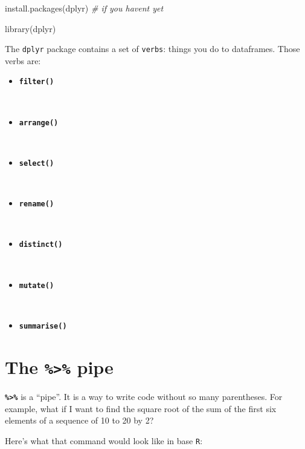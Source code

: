 \documentclass[
]{book}
\newenvironment{Shaded}{\begin{snugshade}}{\end{snugshade}}
\newcommand{\CommentTok}[1]{\textcolor[rgb]{0.56,0.35,0.01}{\textit{#1}}}
\newcommand{\FunctionTok}[1]{\textcolor[rgb]{0.00,0.00,0.00}{#1}}
\newcommand{\NormalTok}[1]{#1}
\newcommand{\StringTok}[1]{\textcolor[rgb]{0.31,0.60,0.02}{#1}}
\providecommand{\tightlist}{%
  \setlength{\itemsep}{0pt}\setlength{\parskip}{0pt}}
\begin{document}
\begin{Shaded}
\begin{Highlighting}[]
\FunctionTok{install.packages}\NormalTok{(}\StringTok{\textquotesingle{}dplyr\textquotesingle{}}\NormalTok{) }\CommentTok{\# if you haven\textquotesingle{}t yet}
\end{Highlighting}
\end{Shaded}

\begin{Shaded}
\begin{Highlighting}[]
\FunctionTok{library}\NormalTok{(dplyr)}
\end{Highlighting}
\end{Shaded}

The \texttt{dplyr} package contains a set of \texttt{verbs}: things you do to dataframes. Those verbs are:

\begin{itemize}
\tightlist
\item
  \textbf{\texttt{filter()}}\strut \\
\item
  \textbf{\texttt{arrange()}}\strut \\
\item
  \textbf{\texttt{select()}}\strut \\
\item
  \textbf{\texttt{rename()}}\strut \\
\item
  \textbf{\texttt{distinct()}}\strut \\
\item
  \textbf{\texttt{mutate()}}\strut \\
\item
  \textbf{\texttt{summarise()}}
\end{itemize}

\hypertarget{the-pipe}{%
\section*{\texorpdfstring{The \texttt{\%\textgreater{}\%} pipe}{The \%\textgreater\% pipe}}\label{the-pipe}}

\textbf{\texttt{\%\textgreater{}\%}} is a ``pipe''. It is a way to write code without so many parentheses. For example, what if I want to find the square root of the sum of the first six elements of a sequence of 10 to 20 by 2?

Here's what that command would look like in base \texttt{R}:
\end{document}
